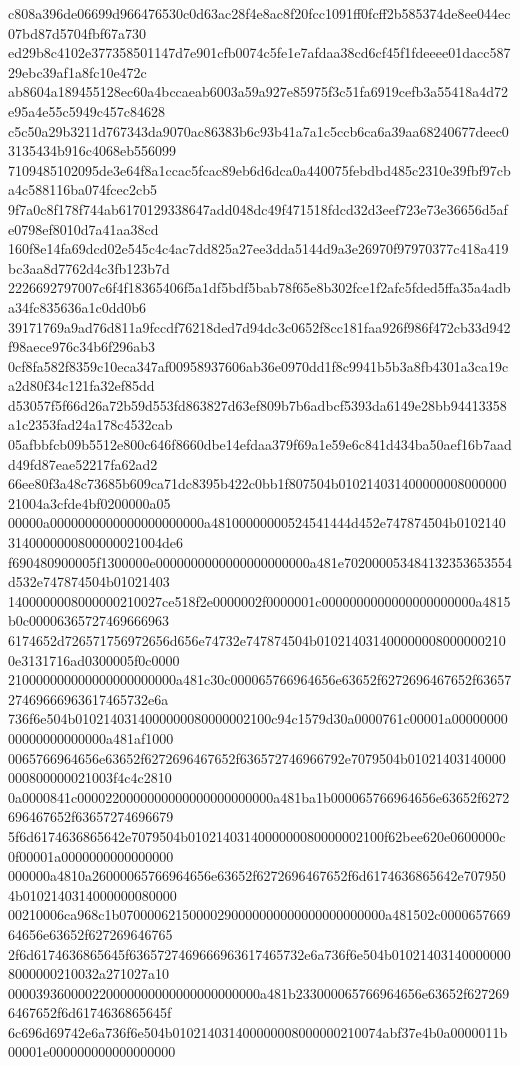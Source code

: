{c808a396de06699d966476530c0d63ac28f4e8ac8f20fcc1091ff0fcff2b585374de8ee044ec07bd87d5704fbf67a730
ed29b8c4102e377358501147d7e901cfb0074c5fe1e7afdaa38cd6cf45f1fdeeee01dacc58729ebc39af1a8fc10e472c
ab8604a189455128ec60a4bccaeab6003a59a927e85975f3c51fa6919cefb3a55418a4d72e95a4e55c5949c457c84628
c5c50a29b3211d767343da9070ac86383b6c93b41a7a1c5ccb6ca6a39aa68240677deec03135434b916c4068eb556099
7109485102095de3e64f8a1ccac5fcac89eb6d6dca0a440075febdbd485c2310e39fbf97cba4c588116ba074fcec2cb5
9f7a0c8f178f744ab6170129338647add048dc49f471518fdcd32d3eef723e73e36656d5afe0798ef8010d7a41aa38cd
160f8e14fa69dcd02e545c4c4ac7dd825a27ee3dda5144d9a3e26970f97970377c418a419bc3aa8d7762d4c3fb123b7d
2226692797007c6f4f18365406f5a1df5bdf5bab78f65e8b302fce1f2afc5fded5ffa35a4adba34fc835636a1c0dd0b6
39171769a9ad76d811a9fccdf76218ded7d94dc3c0652f8cc181faa926f986f472cb33d942f98aece976c34b6f296ab3
0cf8fa582f8359c10eca347af00958937606ab36e0970dd1f8c9941b5b3a8fb4301a3ca19ca2d80f34c121fa32ef85dd
d53057f5f66d26a72b59d553fd863827d63ef809b7b6adbcf5393da6149e28bb94413358a1c2353fad24a178c4532cab
05afbbfcb09b5512e800c646f8660dbe14efdaa379f69a1e59e6c841d434ba50aef16b7aadd49fd87eae52217fa62ad2
66ee80f3a48c73685b609ca71dc8395b422c0bb1f807504b01021403140000000800000021004a3cfde4bf0200000a05
00000a0000000000000000000000a48100000000524541444d452e747874504b01021403140000000800000021004de6
f690480900005f1300000e0000000000000000000000a481e702000053484132353653554d532e747874504b01021403
1400000008000000210027ce518f2e0000002f0000001c0000000000000000000000a4815b0c00006365727469666963
6174652d726571756972656d656e74732e747874504b0102140314000000080000002100e3131716ad0300005f0c0000
210000000000000000000000a481c30c000065766964656e63652f6272696467652f6365727469666963617465732e6a
736f6e504b0102140314000000080000002100c94c1579d30a0000761c00001a0000000000000000000000a481af1000
0065766964656e63652f6272696467652f636572746966792e7079504b01021403140000000800000021003f4c4c2810
0a0000841c0000220000000000000000000000a481ba1b000065766964656e63652f6272696467652f63657274696679
5f6d6174636865642e7079504b0102140314000000080000002100f62bee620e0600000c0f00001a0000000000000000
000000a4810a26000065766964656e63652f6272696467652f6d6174636865642e7079504b0102140314000000080000
00210006ca968c1b07000062150000290000000000000000000000a481502c000065766964656e63652f627269646765
2f6d6174636865645f6365727469666963617465732e6a736f6e504b010214031400000008000000210032a271027a10
000039360000220000000000000000000000a481b233000065766964656e63652f6272696467652f6d6174636865645f
6c696d69742e6a736f6e504b010214031400000008000000210074abf37e4b0a0000011b00001e000000000000000000
}
